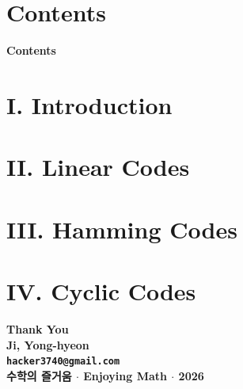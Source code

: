 \documentclass[10pt,aspectratio=1610,compress,dvipsnames]{beamer}
\begin{document}
\begin{frame}
  \titlepage
\end{frame}

\section*{Contents}
\begin{frame}{\textbf{Contents}}
  \tableofcontents
\end{frame}

\section{I. Introduction}


\section{II. Linear Codes}


\section{III. Hamming Codes}


\section{IV. Cyclic Codes}


\begin{frame}[plain]
  \begin{center}\bfseries\centering
    \vspace{2cm}
    {\Huge\color{TealDarkCyan} Thank You}\\[.5cm]
    {\large\color{black} Ji, Yong-hyeon}\\[.3cm]
    {\normalsize\texttt{hacker3740@gmail.com}}\\[.5cm]
    {\small\color{gray} 수학의 즐거움 $\cdot$ Enjoying Math $\cdot$ 2026}
    \bigskip
  \end{center}
\end{frame}
\end{document}
